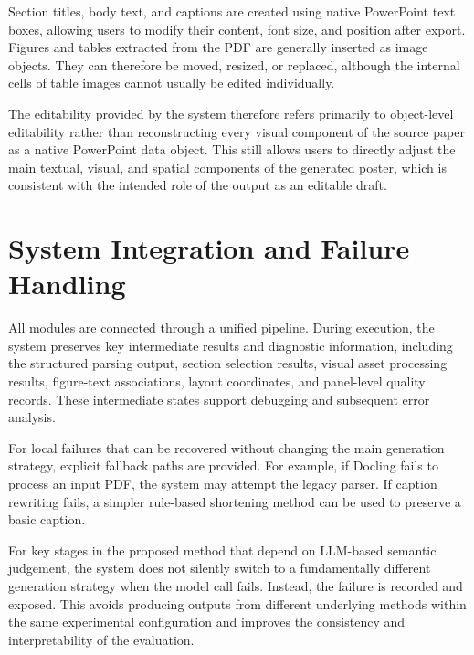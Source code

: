 \documentclass[12pt,oneside]{report}
\begin{document}
Section titles, body text, and captions are created using native PowerPoint text boxes, allowing users to modify their content, font size, and position after export. Figures and tables extracted from the PDF are generally inserted as image objects. They can therefore be moved, resized, or replaced, although the internal cells of table images cannot usually be edited individually.

\vspace{1em}

The editability provided by the system therefore refers primarily to object-level editability rather than reconstructing every visual component of the source paper as a native PowerPoint data object. This still allows users to directly adjust the main textual, visual, and spatial components of the generated poster, which is consistent with the intended role of the output as an editable draft.

\section{System Integration and Failure Handling}

All modules are connected through a unified pipeline. During execution, the system preserves key intermediate results and diagnostic information, including the structured parsing output, section selection results, visual asset processing results, figure-text associations, layout coordinates, and panel-level quality records. These intermediate states support debugging and subsequent error analysis.

\vspace{1em}

For local failures that can be recovered without changing the main generation strategy, explicit fallback paths are provided. For example, if Docling fails to process an input PDF, the system may attempt the legacy parser. If caption rewriting fails, a simpler rule-based shortening method can be used to preserve a basic caption.

\vspace{1em}

For key stages in the proposed method that depend on LLM-based semantic judgement, the system does not silently switch to a fundamentally different generation strategy when the model call fails. Instead, the failure is recorded and exposed. This avoids producing outputs from different underlying methods within the same experimental configuration and improves the consistency and interpretability of the evaluation.
\end{document}
